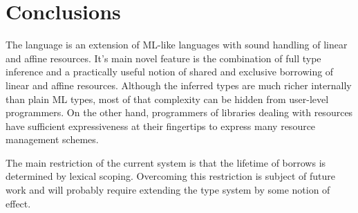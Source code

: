 
\section{Conclusions}
\label{sec:conclusions}

The \lang language is an extension of ML-like languages with sound handling of linear and affine resources. It's main novel feature is the combination of full type inference and a practically useful notion of shared and exclusive borrowing of linear and affine resources.
Although the inferred types are much richer internally than plain ML types, most of that complexity can be hidden from user-level programmers. On the other hand, programmers of libraries dealing with resources have sufficient expressiveness at their fingertips to express many resource management schemes.

The main restriction of the current system is that the lifetime of borrows is determined by lexical scoping. Overcoming this restriction is subject of future work and will probably require extending the type system by some notion of effect. 

